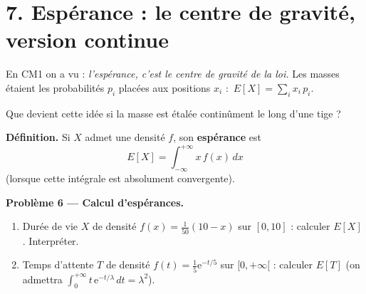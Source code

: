 \section*{7. Espérance : le centre de gravité, version continue}

En CM1 on a vu : \emph{l'espérance, c'est le centre de gravité
de la loi.} Les \og masses \fg{} étaient les probabilités $p_i$
placées aux positions $x_i$ :
\(\,E[X]=\sum_i x_i\, p_i.\)

\medskip

Que devient cette idée si la masse est étalée continûment
le long d'une tige ? 


\begin{mdframed}[backgroundcolor=ThemeLight, linecolor=Theme,
  linewidth=1pt, innertopmargin=8pt, innerbottommargin=8pt, nobreak=true]
\textbf{Définition.}
Si $X$ admet une densité $f$, son \textbf{espérance} est
\[
  \boxed{\,E[X]=\int_{-\infty}^{+\infty} x\,f(x)\,dx\,}
\]
(lorsque cette intégrale est absolument convergente).
\end{mdframed}

\textbf{Problème 6 --- Calcul d'espérances.}
\begin{enumerate}
  \item Durée de vie $X$ de densité
  $f(x)=\tfrac{1}{50}(10-x)$ sur $[0,10]$ : calculer $E[X]$.
  Interpréter.
  \item Temps d'attente $T$ de densité
  $f(t)=\tfrac{1}{5}\mathrm{e}^{-t/5}$ sur $[0,+\infty[$ :
  calculer $E[T]$ (on admettra
  $\int_0^{+\infty} t\,\mathrm{e}^{-t/\lambda}\,dt = \lambda^2$).
\end{enumerate}


